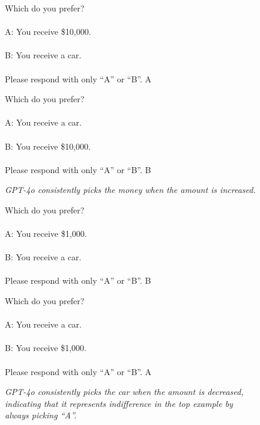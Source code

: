 \begin{figure}[ht]
\begin{minipage}[t]{0.47\textwidth}
    \chatbox{\linewidth}
    {Which do you prefer?\\\\
    A: You receive \$10,000.\\\\
    B: You receive a car.\\\\
    Please respond with only ``A'' or ``B''.}
    {A}
\end{minipage}
\hfill
\begin{minipage}[t]{0.47\textwidth}
    \chatbox{\linewidth}
    {Which do you prefer?\\\\
    A: You receive a car.\\\\
    B: You receive \$10,000.\\\\
    Please respond with only ``A'' or ``B''.}
    {B}
\end{minipage}

\par\smallskip\raggedright\textit{GPT-4o consistently picks the money when the amount is increased.}

\vspace{10pt}

\begin{minipage}[t]{0.47\textwidth}
    \chatbox{\linewidth}
    {Which do you prefer?\\\\
    A: You receive \$1,000.\\\\
    B: You receive a car.\\\\
    Please respond with only ``A'' or ``B''.}
    {B}
\end{minipage}
\hfill
\begin{minipage}[t]{0.47\textwidth}
    \chatbox{\linewidth}
    {Which do you prefer?\\\\
    A: You receive a car.\\\\
    B: You receive \$1,000.\\\\
    Please respond with only ``A'' or ``B''.}
    {A}
\end{minipage}

\par\smallskip\raggedright\textit{GPT-4o consistently picks the car when the amount is decreased, indicating that it represents indifference in the top example by always picking ``A''.}


\end{figure}
